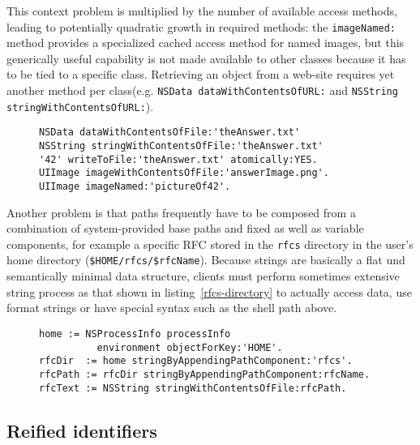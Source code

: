 \documentclass[preprint,authoryear]{llncs}
\begin{document}
This context problem is multiplied by the number of available access methods, leading to potentially quadratic growth in
required methods:
the {\tt imageNamed:} method provides a specialized cached access method for named images, but this generically useful
capability is not made available to other classes because it has to be tied to a specific class.  Retrieving an object from
a web-site requires yet another method per class(e.g. {\tt NSData dataWithContentsOfURL:} and {\tt NSString stringWithContentsOfURL:}).



\begin{figure}[htbp]
\begin{lstlisting}[style=numbers,label=string-file-identifiers,caption=Files of different types accessed using string identifiers.]
NSData dataWithContentsOfFile:'theAnswer.txt'
NSString stringWithContentsOfFile:'theAnswer.txt'
'42' writeToFile:'theAnswer.txt' atomically:YES.
UIImage imageWithContentsOfFile:'answerImage.png'.
UIImage imageNamed:'pictureOf42'.
\end{lstlisting}
\end{figure}

Another problem is that paths frequently have to be composed from a combination of system-provided base paths
and fixed as well as variable components, for example a specific RFC stored in the {\tt rfcs} directory in the user's
home directory ({\tt \$HOME/rfcs/\$rfcName}).  Because strings are basically a flat und semantically minimal data structure, clients
must perform sometimes extensive string process as that shown in listing~\ref{rfcs-directory} to actually access
data, use format strings or have special syntax such as the shell path above.

\begin{figure}[htbp]
\begin{lstlisting}[style=numbers,label=rfcs-directory,caption=Accessing a specific RFC in a directory relative to the user's \$HOME.]
home := NSProcessInfo processInfo 
          environment objectForKey:'HOME'.
rfcDir  := home stringByAppendingPathComponent:'rfcs'.
rfcPath := rfcDir stringByAppendingPathComponent:rfcName.
rfcText := NSString stringWithContentsOfFile:rfcPath.
\end{lstlisting}
\end{figure}




\subsection{Reified identifiers}
\end{document}
